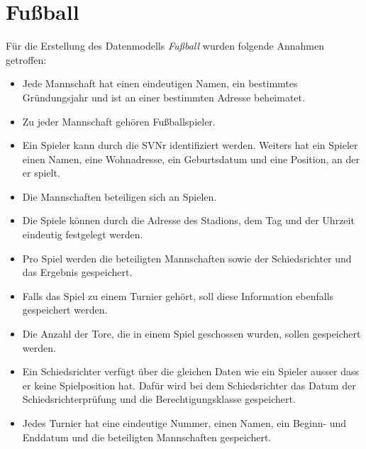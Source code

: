  
\section{Fußball}
\pra

\noindent
Für die Erstellung des Datenmodells \textit{Fußball} wurden folgende Annahmen getroffen:

\begin{itemize}
	\item Jede Mannschaft hat einen eindeutigen Namen, ein bestimmtes Gründungsjahr und ist an einer bestimmten Adresse beheimatet.
	\item Zu jeder Mannschaft gehören Fußballspieler.
	\item Ein Spieler kann durch die SVNr identifiziert werden. Weiters hat ein Spieler einen Namen, eine Wohnadresse, ein Geburtsdatum und eine Position, an der er spielt.
	\item Die Mannschaften beteiligen sich an Spielen. 
	\item Die Spiele können durch die Adresse des Stadions, dem Tag und der Uhrzeit eindeutig festgelegt werden.
	\item Pro Spiel werden die beteiligten Mannschaften sowie der Schiedsrichter und das Ergebnis gespeichert.
	\item Falls das Spiel zu einem Turnier gehört, soll diese Information ebenfalls gespeichert werden.
	\item Die Anzahl der Tore, die in einem Spiel geschossen wurden, sollen gespeichert werden.
	\item Ein Schiedsrichter verfügt über die gleichen Daten wie ein Spieler ausser dass er keine Spielposition hat. Dafür wird bei dem Schiedsrichter das Datum der Schiedsrichterprüfung und die Berechtigungsklasse gespeichert.
	\item Jedes Turnier hat eine eindeutige Nummer, einen Namen, ein Beginn- und Enddatum und die beteiligten Mannschaften gespeichert.
\end{itemize}

